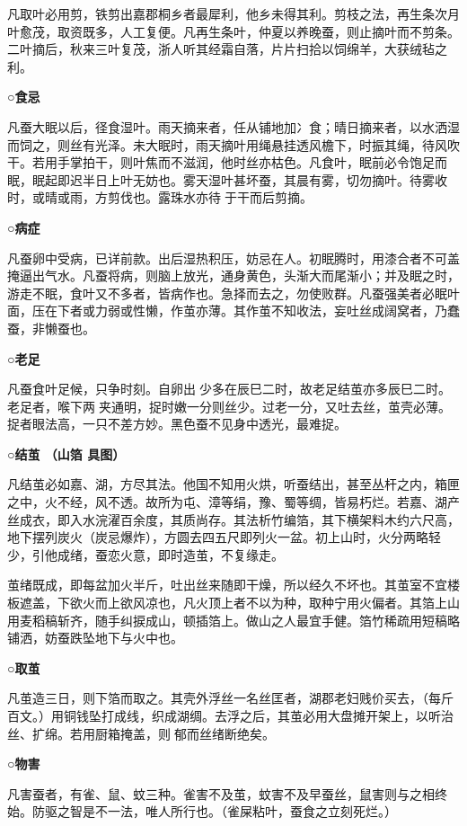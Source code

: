 \documentclass[]{article}
\begin{document}
凡取叶必用剪，铁剪出嘉郡桐乡者最犀利，他乡未得其利。剪枝之法，再生条次月叶愈茂，取资既多，人工复便。凡再生条叶，仲夏以养晚蚕，则止摘叶而不剪条。二叶摘后，秋来三叶复茂，浙人听其经霜自落，片片扫拾以饲绵羊，大获绒毡之利。

\textbf{○食忌}

凡蚕大眠以后，径食湿叶。雨天摘来者，任从铺地加冫食；晴日摘来者，以水洒湿而饲之，则丝有光泽。未大眠时，雨天摘叶用绳悬挂透风檐下，时振其绳，待风吹干。若用手掌拍干，则叶焦而不滋润，他时丝亦枯色。凡食叶，眠前必令饱足而眠，眠起即迟半日上叶无妨也。雾天湿叶甚坏蚕，其晨有雾，切勿摘叶。待雾收时，或晴或雨，方剪伐也。露珠水亦待于干而后剪摘。

\textbf{○病症}

凡蚕卵中受病，已详前款。出后湿热积压，妨忌在人。初眠腾时，用漆合者不可盖掩逼出气水。凡蚕将病，则脑上放光，通身黄色，头渐大而尾渐小；并及眠之时，游走不眠，食叶又不多者，皆病作也。急择而去之，勿使败群。凡蚕强美者必眠叶面，压在下者或力弱或性懒，作茧亦薄。其作茧不知收法，妄吐丝成阔窝者，乃蠢蚕，非懒蚕也。

\textbf{○老足}

凡蚕食叶足候，只争时刻。自卵出少多在辰巳二时，故老足结茧亦多辰巳二时。老足者，喉下两夹通明，捉时嫩一分则丝少。过老一分，又吐去丝，茧壳必薄。捉者眼法高，一只不差方妙。黑色蚕不见身中透光，最难捉。

\textbf{○结茧 （山箔 具图）}

凡结茧必如嘉、湖，方尽其法。他国不知用火烘，听蚕结出，甚至丛杆之内，箱匣之中，火不经，风不透。故所为屯、漳等绢，豫、蜀等绸，皆易朽烂。若嘉、湖产丝成衣，即入水浣濯百余度，其质尚存。其法析竹编箔，其下横架料木约六尺高，地下摆列炭火（炭忌爆炸），方圆去四五尺即列火一盆。初上山时，火分两略轻少，引他成绪，蚕恋火意，即时造茧，不复缘走。

茧绪既成，即每盆加火半斤，吐出丝来随即干燥，所以经久不坏也。其茧室不宜楼板遮盖，下欲火而上欲风凉也，凡火顶上者不以为种，取种宁用火偏者。其箔上山用麦稻稿斩齐，随手纠捩成山，顿插箔上。做山之人最宜手健。箔竹稀疏用短稿略铺洒，妨蚕跌坠地下与火中也。

\textbf{○取茧}

凡茧造三日，则下箔而取之。其壳外浮丝一名丝匡者，湖郡老妇贱价买去，（每斤百文。）用铜钱坠打成线，织成湖绸。去浮之后，其茧必用大盘摊开架上，以听治丝、扩绵。若用厨箱掩盖，则郁而丝绪断绝矣。

\textbf{○物害}

凡害蚕者，有雀、鼠、蚊三种。雀害不及茧，蚊害不及早蚕丝，鼠害则与之相终始。防驱之智是不一法，唯人所行也。（雀屎粘叶，蚕食之立刻死烂。）
\end{document}
